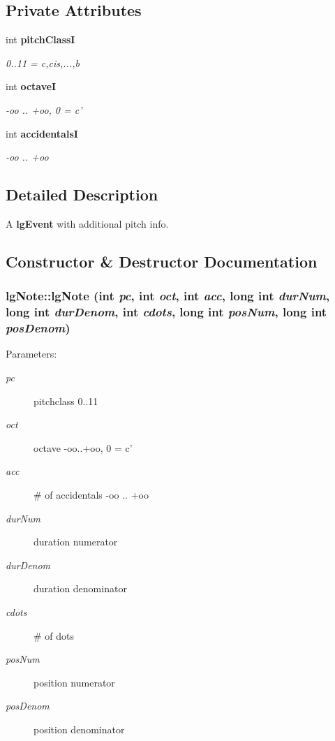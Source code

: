 \subsection*{Private Attributes}
\begin{CompactItemize}
\item 
int {\bf pitch\-Class\-I}
\begin{CompactList}\small\item\em 0..11 = c,cis,...,b \item\end{CompactList}\item 
int {\bf octave\-I}
\begin{CompactList}\small\item\em -oo .. +oo, 0 = c' \item\end{CompactList}\item 
int {\bf accidentals\-I}
\begin{CompactList}\small\item\em -oo .. +oo \item\end{CompactList}\end{CompactItemize}


\subsection{Detailed Description}
A {\bf lg\-Event} with additional pitch info. 



\subsection{Constructor \& Destructor Documentation}
\subsubsection{\setlength{\rightskip}{0pt plus 5cm}lg\-Note::lg\-Note (int {\em pc}, int {\em oct}, int {\em acc}, long int {\em dur\-Num}, long int {\em dur\-Denom}, int {\em cdots}, long int {\em pos\-Num}, long int {\em pos\-Denom})}\label{classlgNote_a7}


\begin{Desc}
\item[Parameters: ]\par
\begin{description}
\item[{\em 
pc}]pitchclass 0..11 \item[{\em 
oct}]octave -oo..+oo, 0 = c' \item[{\em 
acc}]\# of accidentals -oo .. +oo \item[{\em 
dur\-Num}]duration numerator \item[{\em 
dur\-Denom}]duration denominator \item[{\em 
cdots}]\# of dots \item[{\em 
pos\-Num}]position numerator \item[{\em 
pos\-Denom}]position denominator \end{description}
\end{Desc}


